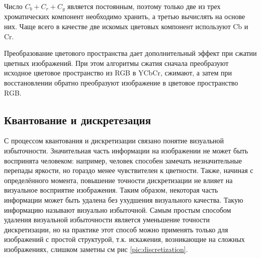 Число $C_b+C_r+C_g$ является постоянным, поэтому только две из трех хроматических компонент необходимо хранить, а третью вычислять на основе них. Чаще всего в качестве две искомых цветовых компонент используют Cb и Cr. 

Преобразование цветового пространства дает дополнительный эффект при сжатии цветных изображений. При этом алгоритмы сжатия сначала преобразуют исходное цветовое пространство из RGB в YCbCr, сжимают, а затем при восстановлении обратно преобразуют изображение в цветовое пространство RGB.

\subsection*{Квантование и дискретезация}
С процессом квантования и дискретизации связано понятие визуальной избыточности. Значительная часть информации на изображении не может быть воспринята человеком: например, человек способен замечать незначительные перепады яркости, но гораздо менее чувствителен к цветности. Также, начиная с определённого момента, повышение точности дискретизации не влияет на визуальное восприятие изображения. Таким образом, некоторая часть информации может быть удалена без ухудшения визуального качества. Такую информацию называют визуально избыточной.
Самым простым способом удаления визуальной избыточности является уменьшение точности дискретизации, но на практике этот способ можно применять только для изображений с простой структурой, т.к. искажения, возникающие на сложных изображениях, слишком заметны см рис \ref{pic:discretization}.

